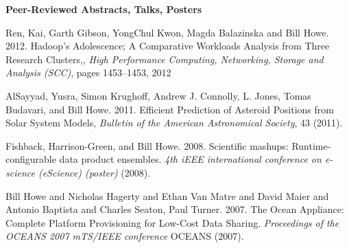 {\bf Peer-Reviewed Abstracts, Talks, Posters}
\begin{bulletlist}

\item Ren, Kai, Garth Gibson, YongChul Kwon, Magda Balazinska and Bill Howe. 2012.
Hadoop's Adolescence; A Comparative Workloads Analysis from Three Research Clusters,,
\emph{High Performance Computing, Networking, Storage and Analysis (SCC)}, 
pages 1453--1453, 2012

\item AlSayyad, Yusra, Simon Krughoff, Andrew J. Connolly,  L. Jones, Tomas Budavari, and Bill Howe. 2011. Efficient Prediction of Asteroid Positions from Solar System Models, 
\emph{Bulletin of the American Astronomical Society}, 43 (2011).

\item Fishback, Harrison-Green, and Bill Howe. 2008. Scientific mashups:
Runtime-configurable data product ensembles. \emph{4th iEEE
international conference on e-science (eScience) (poster)} (2008).

\item Bill Howe and Nicholas
Hagerty and Ethan Van Matre and David Maier and Antonio Baptista and
Charles Seaton, Paul Turner. 2007. The Ocean Appliance: Complete
Platform Provisioning for Low-Cost Data Sharing. \emph{Proceedings of
the OCEANS 2007 mTS/IEEE conference} OCEANS (2007). 

\end{bulletlist}

